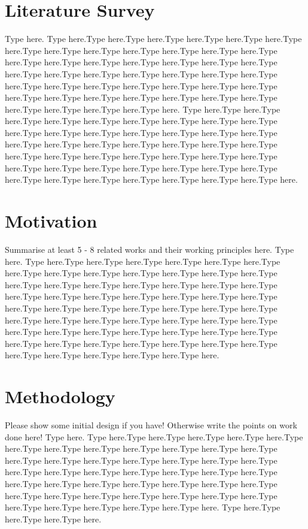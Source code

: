 \documentclass[10pt,a4paper,twocolumn]{article}
\begin{document}
	\vspace{2em}
	
	
	\section{Literature Survey}
	Type here. Type here.Type here.Type here.Type here.Type here.Type here.Type here.Type here.Type here.Type here.Type here.Type here.Type here.Type here.Type here.Type here.Type here.Type here.Type here.Type here.Type here.Type here.Type here.Type here.Type here.Type here.Type here.Type here.Type here.Type here.Type here.Type here.Type here.Type here.Type here.Type here.Type here.Type here.Type here.Type here.Type here.Type here.Type here.Type here.Type here.Type here. Type here.Type here.Type here.Type here.Type here.Type here.Type here.Type here.Type here.Type here.Type here.Type here.Type here.Type here.Type here.Type here.Type here.Type here.Type here.Type here.Type here.Type here.Type here.Type here.Type here.Type here.Type here.Type here.Type here.Type here.Type here.Type here.Type here.Type here.Type here.Type here.Type here.Type here.Type here.Type here.Type here.Type here.Type here.Type here.Type here.
	
	\section{Motivation}
	
	Summarise at least 5 - 8 related works and their working principles here.
	Type here. Type here.Type here.Type here.Type here.Type here.Type here.Type here.Type here.Type here.Type here.Type here.Type here.Type here.Type here.Type here.Type here.Type here.Type here.Type here.Type here.Type here.Type here.Type here.Type here.Type here.Type here.Type here.Type here.Type here.Type here.Type here.Type here.Type here.Type here.Type here.Type here.Type here.Type here.Type here.Type here.Type here.Type here.Type here.Type here.Type here.Type here.Type here.Type here.Type here.Type here.Type here.Type here.Type here.Type here.Type here.Type here.Type here.Type here.Type here.Type here.Type here.
	
	
	\vspace{4em}
	\section{Methodology}
	Please show some initial design if you have! Otherwise write the points on work done here!
	Type here. Type here.Type here.Type here.Type here.Type here.Type here.Type here.Type here.Type here.Type here.Type here.Type here.Type here.Type here.Type here.Type here.Type here.Type here.Type here.Type here.Type here.Type here.Type here.Type here.Type here.Type here.Type here.Type here.Type here.Type here.Type here.Type here.Type here.Type here.Type here.Type here.Type here.Type here.Type here.Type here.Type here.Type here.Type here.Type here.Type here.Type here. Type here.Type here.Type here.Type here.
	
\end{document}
